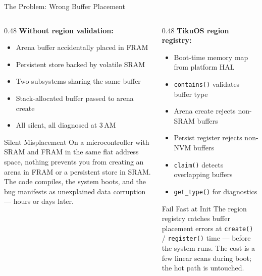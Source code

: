 \documentclass[aspectratio=169, 10pt]{beamer}
\begin{document}
\begin{frame}{The Problem: Wrong Buffer Placement}
\begin{columns}[T]
\begin{column}{0.48\textwidth}
\textbf{Without region validation:}
\begin{itemize}
  \item Arena buffer accidentally placed in FRAM
  \item Persistent store backed by volatile SRAM
  \item Two subsystems sharing the same buffer
  \item Stack-allocated buffer passed to arena create
  \item All silent, all diagnosed at 3\,AM
\end{itemize}

\vspace{0.5em}
\begin{alertblock}{Silent Misplacement}
On a microcontroller with SRAM and FRAM in the same flat
address space, nothing prevents you from creating an arena
in FRAM or a persistent store in SRAM.  The code compiles,
the system boots, and the bug manifests as unexplained data
corruption --- hours or days later.
\end{alertblock}
\end{column}

\begin{column}{0.48\textwidth}
\textbf{TikuOS region registry:}
\begin{itemize}
  \item Boot-time memory map from platform HAL
  \item \texttt{contains()} validates buffer type
  \item Arena create rejects non-SRAM buffers
  \item Persist register rejects non-NVM buffers
  \item \texttt{claim()} detects overlapping buffers
  \item \texttt{get\_type()} for diagnostics
\end{itemize}

\vspace{0.5em}
\begin{block}{Fail Fast at Init}
The region registry catches buffer placement errors at
\texttt{create()} / \texttt{register()} time --- before the
system runs.  The cost is a few linear scans during boot;
the hot path is untouched.
\end{block}
\end{column}
\end{columns}
\end{frame}
\end{document}
